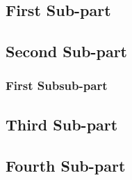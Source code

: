 \subsection{First Sub-part}

\subsection{Second Sub-part}

\subsubsection{First Subsub-part}

\subsection{Third Sub-part}

\subsection{Fourth Sub-part}

